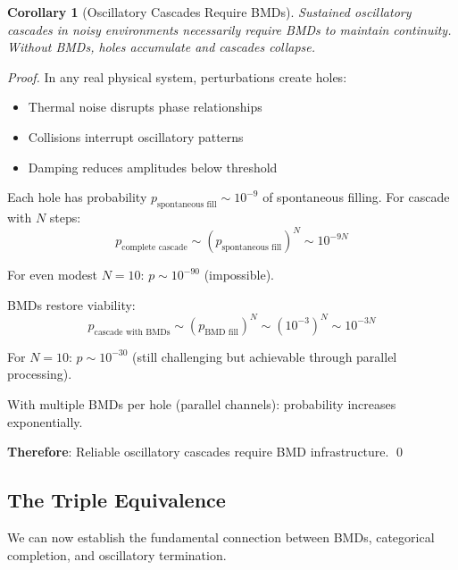 \documentclass[12pt,a4paper]{article}
\newtheorem{corollary}{Corollary}
\begin{document}
\begin{corollary}[Oscillatory Cascades Require BMDs]
\label{cor:cascades_require_bmds}
Sustained oscillatory cascades in noisy environments necessarily require BMDs to maintain continuity. Without BMDs, holes accumulate and cascades collapse.
\end{corollary}

\begin{proof}
In any real physical system, perturbations create holes:
\begin{itemize}
\item Thermal noise disrupts phase relationships
\item Collisions interrupt oscillatory patterns
\item Damping reduces amplitudes below threshold
\end{itemize}

Each hole has probability $p_{\text{spontaneous fill}} \sim 10^{-9}$ of spontaneous filling. For cascade with $N$ steps:
\begin{equation}
p_{\text{complete cascade}} \sim (p_{\text{spontaneous fill}})^N \sim 10^{-9N}
\end{equation}

For even modest $N = 10$: $p \sim 10^{-90}$ (impossible).

BMDs restore viability:
\begin{equation}
p_{\text{cascade with BMDs}} \sim (p_{\text{BMD fill}})^N \sim (10^{-3})^N \sim 10^{-3N}
\end{equation}

For $N = 10$: $p \sim 10^{-30}$ (still challenging but achievable through parallel processing).

With multiple BMDs per hole (parallel channels): probability increases exponentially.

\textbf{Therefore}: Reliable oscillatory cascades require BMD infrastructure. \qed
\end{proof}

\subsection{The Triple Equivalence}

We can now establish the fundamental connection between BMDs, categorical completion, and oscillatory termination.
\end{document}
